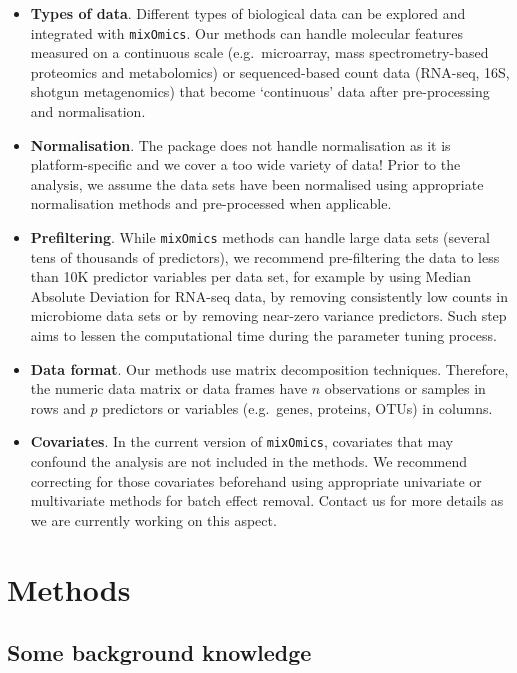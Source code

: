 \documentclass[]{book}
\begin{document}
\begin{itemize}
\item
  \textbf{Types of data}. Different types of biological data can be explored and integrated with \texttt{mixOmics}. Our methods can handle molecular features measured on a continuous scale (e.g.~microarray, mass spectrometry-based proteomics and metabolomics) or sequenced-based count data (RNA-seq, 16S, shotgun metagenomics) that become `continuous' data after pre-processing and normalisation.
\item
  \textbf{Normalisation}. The package does not handle normalisation as it is platform-specific and we cover a too wide variety of data! Prior to the analysis, we assume the data sets have been normalised using appropriate normalisation methods and pre-processed when applicable.
\item
  \textbf{Prefiltering}. While \texttt{mixOmics} methods can handle large data sets (several tens of thousands of predictors), we recommend pre-filtering the data to less than 10K predictor variables per data set, for example by using Median Absolute Deviation \citep{Ten16} for RNA-seq data, by removing consistently low counts in microbiome data sets \citep{Lec16} or by removing near-zero variance predictors. Such step aims to lessen the computational time during the parameter tuning process.
\item
  \textbf{Data format}.
  Our methods use matrix decomposition techniques. Therefore, the numeric data matrix or data frames have \(n\) observations or samples in rows and \(p\) predictors or variables (e.g.~genes, proteins, OTUs) in columns.
\item
  \textbf{Covariates}. In the current version of \texttt{mixOmics}, covariates that may confound the analysis are not included in the methods. We recommend correcting for those covariates beforehand using appropriate univariate or multivariate methods for batch effect removal. Contact us for more details as we are currently working on this aspect.
\end{itemize}

\hypertarget{methods}{%
\section{Methods}\label{methods}}

\hypertarget{intro:background}{%
\subsection{Some background knowledge}\label{intro:background}}
\end{document}
